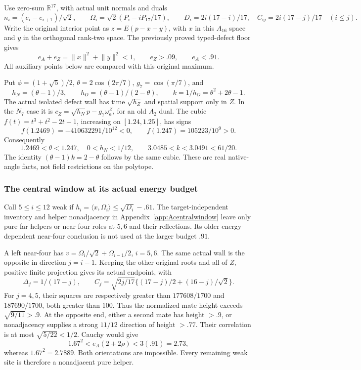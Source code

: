 \documentclass[11pt]{article}
\theoremstyle{definition}
\theoremstyle{remark}
\newcommand{\ip}[2]{\langle #1,#2\rangle}
\newcommand{\norm}[1]{\lVert #1\rVert}
\begin{document}
Use zero-sum \(\mathbb R^{17}\), with actual unit normals and duals
\[
 n_i=(e_i-e_{i+1})/\sqrt2,\qquad
 \Omega_i=\sqrt2(P_i-iP_{17}/17),\qquad
 D_i=2i(17-i)/17,\quad C_{ij}=2i(17-j)/17\quad(i\le j).
\]
Write the original interior point as \(z=E(p-x-y)\), with
\(x\) in this \(A_{16}\) space and \(y\) in the orthogonal
rank-two space.  The previously proved typed-defect floor gives
\[
 e_A+e_Z=\norm x^2+\norm y^2<1,\qquad e_Z>.09,
 \qquad e_A<.91.                                      \tag{T1}
\]
All auxiliary points below are compared with this original maximum.

Put \(\phi=(1+\sqrt5)/2\), \(\theta=2\cos(2\pi/7)\),
\(g_7=\cos(\pi/7)\), and
\[
 h_N=(\theta-1)/3,\qquad h_O=(\theta-1)/(2-\theta),
 \qquad k=1/h_O=\theta^2+2\theta-1.
\]
The actual isolated defect wall has time \(\sqrt{h_Z}\) and
spatial support only in \(Z\).  In the \(N_7\) case it is
\(c_Z=\sqrt{h_N}p-g_7\omega_a^Z\), for an old \(A_2\) dual.
The cubic \(f(t)=t^3+t^2-2t-1\), increasing on \([1.24,1.25]\),
has signs
\[
 f(1.2469)=-410632291/10^{12}<0,\qquad
 f(1.247)=105223/10^9>0.
\]
Consequently
\[
 1.2469<\theta<1.247,\quad 0<h_N<1/12,\qquad
 3.0485<k<3.0491<61/20.                              \tag{T2}
\]
The identity \((\theta-1)k=2-\theta\) follows by the same cubic.
These are real native-angle facts, not field restrictions on the polytope.

\subsubsection{The central window at its actual energy budget}
Call \(5\le i\le12\) weak if
\(h_i=\ip{x}{\Omega_i}\le\sqrt{D_i}-.61\).
The target-independent inventory and helper nonadjacency in
Appendix~\ref{app:Acentralwindow} leave only pure far helpers or
near-four roles at \(5,6\) and their reflections.
Its older energy-dependent near-four conclusion is not used at the
larger budget \(.91\).

A left near-four has
\(v=\Omega_i/\sqrt2+\Omega_{i-1}/2\), \(i=5,6\).
The same actual wall is the opposite in direction \(j=i-1\).
Keeping the other original roots and all of \(Z\), positive finite
projection gives its actual endpoint, with
\[
 \Delta_j=1/(17-j),\qquad
 C_j=\sqrt{2j/17}\{(17-j)/2+(16-j)/\sqrt2\}.
\]
For \(j=4,5\), their squares are respectively greater than
\(177608/1700\) and \(187690/1700\), both greater than \(100\).
Thus the normalized mate height exceeds \(\sqrt{9/11}>.9\).
At the opposite end, either a second mate has height \(>.9\), or
nonadjacency supplies a strong \(11/12\) direction of height \(>.77\).
Their correlation is at most \(\sqrt{5/22}<1/2\).
Cauchy would give
\[
 1.67^2<e_A(2+2\rho)<3(.91)=2.73,
\]
whereas \(1.67^2=2.7889\).  Both orientations are impossible.
Every remaining weak site is therefore a nonadjacent pure helper.
\end{document}
